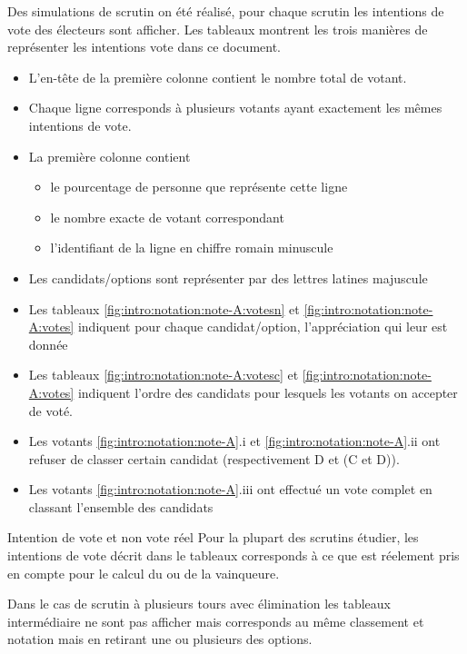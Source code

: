 \documentclass[../report]{subfiles}
\begin{document}
  Des simulations de scrutin on été réalisé, pour chaque scrutin les intentions de vote des électeurs sont afficher.
  Les tableaux  montrent les trois manières de représenter les intentions vote dans ce document.
  \begin{itemize}
  	\item L'en-tête de la première colonne contient le nombre total de votant.
  	\item Chaque ligne corresponds à plusieurs votants ayant exactement les mêmes intentions de vote.
  	\item La première colonne contient 
  	\begin{itemize}
  		\item le pourcentage de personne que représente cette ligne
  		\item le nombre exacte de votant correspondant 
  		\item l'identifiant de la ligne en chiffre romain minuscule
  	\end{itemize}
  	\item Les candidats/options sont représenter par des lettres latines majuscule
  	\item Les tableaux \ref{fig:intro:notation:note-A:votesn} et \ref{fig:intro:notation:note-A:votes} indiquent 
  	  pour chaque candidat/option, l'appréciation qui leur est donnée
  	\item Les tableaux \ref{fig:intro:notation:note-A:votesc} et \ref{fig:intro:notation:note-A:votes} indiquent 
  	  l'ordre des candidats pour lesquels les votants on accepter de voté.
  	\item Les votants \ref{fig:intro:notation:note-A}.i et \ref{fig:intro:notation:note-A}.ii ont refuser de classer certain candidat 
  	  (respectivement D et (C et D)).
  	\item Les votants \ref{fig:intro:notation:note-A}.iii ont effectué un vote complet en classant l'ensemble des candidats
  \end{itemize}
  
  
  
  \begin{nota}{Intention de vote et non vote réel}
  	Pour la plupart des scrutins étudier, les intentions de vote décrit dans le tableaux corresponds à ce que est réelement pris en
  	compte pour le calcul du ou de la vainqueure.
  	
  	Dans le cas de scrutin à plusieurs tours avec élimination les tableaux intermédiaire ne sont pas afficher mais corresponds au même 
  	classement et notation mais en retirant une ou plusieurs des options.
  \end{nota}
  
\end{document}
